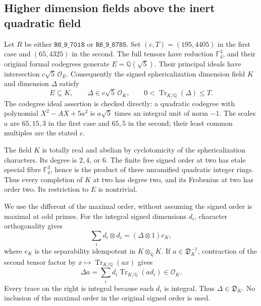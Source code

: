 \subsection{Higher dimension fields above the inert quadratic field}
Let $R$ be either $\texttt{R6\_9\_7018}$ or $\texttt{R6\_9\_8785}$.
Set $(c,T)=(195,4405)$ in the first case and $(65,4325)$ in the second.
The full tensors have reduction $\mathbb F_4^3$, and their original
formal codegrees generate $E=\mathbb Q(\sqrt5)$. Their principal ideals
have intersection $c\sqrt5\,\mathcal O_E$. Consequently the signed
sphericalization dimension field $K$ and dimension $\Delta$ satisfy
\[
 E\subseteq K,\qquad \Delta\in c\sqrt5\,\mathcal O_K,\qquad
 0<\operatorname{Tr}_{K/\mathbb Q}(\Delta)\le T.
\]
The codegree ideal assertion is checked directly: a quadratic codegree
with polynomial $X^2-A X+5a^2$ is $a\sqrt5$ times an integral unit of
norm $-1$. The scales $a$ are $65,15,3$ in the first case and $65,5$
in the second; their least common multiples are the stated $c$.

The field $K$ is totally real and abelian by cyclotomicity of the
sphericalization characters. Its degree is $2,4$, or $6$. The finite
free signed order at two has etale special fibre $\mathbb F_4^3$, hence
is the product of three unramified quadratic integer rings. Thus every
completion of $K$ at two has degree two, and its Frobenius at two has
order two. Its restriction to $E$ is nontrivial.

We use the different of the maximal order, without assuming the signed
order is maximal at odd primes. For the integral signed dimensions $d_i$,
character orthogonality gives
\[
 \sum_i d_i\otimes d_i=(\Delta\otimes1)e_K,
\]
where $e_K$ is the separability idempotent in $K\otimes_{\mathbb Q}K$.
If $a\in\mathfrak D_K^{-1}$, contraction of the second tensor factor
by $x\mapsto\operatorname{Tr}_{K/\mathbb Q}(ax)$ gives
\[
 \Delta a=\sum_i d_i\operatorname{Tr}_{K/\mathbb Q}(ad_i)
 \in\mathcal O_K.
\]
Every trace on the right is integral because each $d_i$ is integral.
Thus $\Delta\in\mathfrak D_K$. No inclusion of the maximal order in
the original signed order is used.

